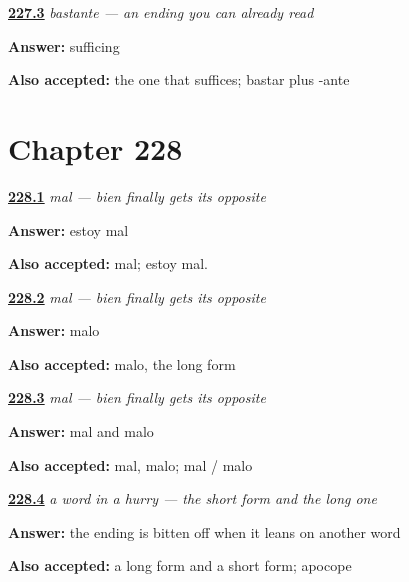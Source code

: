 \noindent\begin{minipage}[t]{\linewidth}
\raggedright
\hyperlink{review-ES-C60-bastante-parts}{\textbf{227.3}} \emph{bastante — an ending you can already read}\par
\small \textbf{Answer:} sufficing\par
\footnotesize \textbf{Also accepted:} the one that suffices; bastar plus -ante
\end{minipage}\par\medskip

\section*{Chapter 228}

\noindent\begin{minipage}[t]{\linewidth}
\raggedright
\hyperlink{review-ES-C60-mal-say}{\textbf{228.1}} \emph{mal — bien finally gets its opposite}\par
\small \textbf{Answer:} estoy mal\par
\footnotesize \textbf{Also accepted:} mal; estoy mal.
\end{minipage}\par\medskip

\noindent\begin{minipage}[t]{\linewidth}
\raggedright
\hyperlink{review-ES-C60-mal-adj}{\textbf{228.2}} \emph{mal — bien finally gets its opposite}\par
\small \textbf{Answer:} malo\par
\footnotesize \textbf{Also accepted:} malo, the long form
\end{minipage}\par\medskip

\noindent\begin{minipage}[t]{\linewidth}
\raggedright
\hyperlink{review-ES-C60-mal-pairs}{\textbf{228.3}} \emph{mal — bien finally gets its opposite}\par
\small \textbf{Answer:} mal and malo\par
\footnotesize \textbf{Also accepted:} mal, malo; mal / malo
\end{minipage}\par\medskip

\noindent\begin{minipage}[t]{\linewidth}
\raggedright
\hyperlink{review-ES-C60-apocope-pattern}{\textbf{228.4}} \emph{a word in a hurry — the short form and the long one}\par
\small \textbf{Answer:} the ending is bitten off when it leans on another word\par
\footnotesize \textbf{Also accepted:} a long form and a short form; apocope
\end{minipage}\par\medskip

